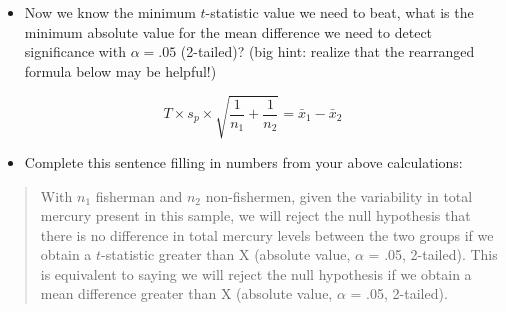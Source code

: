 \documentclass[]{article}
\newenvironment{Shaded}{\begin{snugshade}}{\end{snugshade}}
\newcommand{\KeywordTok}[1]{\textcolor[rgb]{0.13,0.29,0.53}{\textbf{#1}}}
\newcommand{\DataTypeTok}[1]{\textcolor[rgb]{0.13,0.29,0.53}{#1}}
\newcommand{\DecValTok}[1]{\textcolor[rgb]{0.00,0.00,0.81}{#1}}
\newcommand{\StringTok}[1]{\textcolor[rgb]{0.31,0.60,0.02}{#1}}
\newcommand{\CommentTok}[1]{\textcolor[rgb]{0.56,0.35,0.01}{\textit{#1}}}
\newcommand{\OperatorTok}[1]{\textcolor[rgb]{0.81,0.36,0.00}{\textbf{#1}}}
\newcommand{\NormalTok}[1]{#1}
\providecommand{\tightlist}{%
  \setlength{\itemsep}{0pt}\setlength{\parskip}{0pt}}
\begin{document}
\begin{Shaded}
\end{Shaded}

\begin{itemize}
\tightlist
\item
  Now we know the minimum \(t\)-statistic value we need to beat, what is
  the minimum absolute value for the mean difference we need to detect
  significance with \(\alpha = .05\) (2-tailed)? (big hint: realize that
  the rearranged formula below may be helpful!)
\end{itemize}

\[{\displaystyle T \times {s_{p}\times {\sqrt {{\frac {1}{n_{1}}}+{\frac {1}{n_{2}}}}}}}={{\bar {x}}_{1}-{\bar {x}}_{2}}\]

\begin{itemize}
\tightlist
\item
  Complete this sentence filling in numbers from your above
  calculations:
\end{itemize}

\begin{quote}
With \(n_1\) fisherman and \(n_2\) non-fishermen, given the variability
in total mercury present in this sample, we will reject the null
hypothesis that there is no difference in total mercury levels between
the two groups if we obtain a \(t\)-statistic greater than X (absolute
value, \(\alpha\) = .05, 2-tailed). This is equivalent to saying we will
reject the null hypothesis if we obtain a mean difference greater than X
(absolute value, \(\alpha\) = .05, 2-tailed).
\end{quote}
\end{document}
